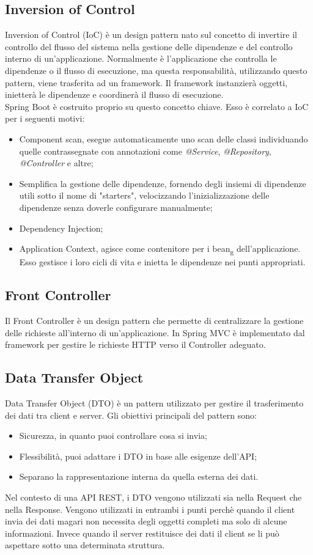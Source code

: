 \subsection*{Inversion of Control}
Inversion of Control (IoC) è un design pattern nato sul concetto di invertire il controllo del flusso del sistema nella gestione delle dipendenze e del controllo interno di un'applicazione. Normalmente è l'applicazione che controlla le dipendenze o il flusso di esecuzione, ma questa responsabilità, utilizzando questo pattern, viene trasferita ad un framework. Il framework instanzierà oggetti, inietterà le dipendenze e coordinerà il flusso di esecuzione.\\
Spring Boot è costruito proprio su questo concetto chiave. Esso è correlato a IoC per i seguenti motivi:
\begin{itemize}
\item Component scan, esegue automaticamente uno scan delle classi individuando quelle contrassegnate con annotazioni come \textit{@Service}, \textit{@Repository}, \textit{@Controller} e altre;
\item Semplifica la gestione delle dipendenze, fornendo degli insiemi di dipendenze utili sotto il nome di "starters", velocizzando l'inizializzazione delle dipendenze senza doverle configurare manualmente;
\item Dependency Injection;
\item Application Context, agisce come contenitore per i bean\textsubscript{g} dell'applicazione. Esso gestisce i loro cicli di vita e inietta le dipendenze nei punti appropriati.
\end{itemize}
\subsection*{Front Controller}
Il Front Controller è un design pattern che permette di centralizzare la gestione delle richieste all'interno di un'applicazione. In Spring MVC è implementato dal framework per gestire le richieste HTTP verso il Controller adeguato.
\subsection*{Data Transfer Object}
Data Transfer Object (DTO) è un pattern utilizzato per gestire il trasferimento dei dati tra client e server. Gli obiettivi principali del pattern sono:
\begin{itemize}
\item Sicurezza, in quanto puoi controllare cosa si invia;
\item Flessibilità, puoi adattare i DTO in base alle esigenze dell'API;
\item Separano la rappresentazione interna da quella esterna dei dati.
\end{itemize}
Nel contesto di una API REST, i DTO vengono utilizzati sia nella Request che nella Response. Vengono utilizzati in entrambi i punti perchè quando il client invia dei dati magari non necessita degli oggetti completi ma solo di alcune informazioni. Invece quando il server restituisce dei dati il client se li può aspettare sotto una determinata struttura.\\


